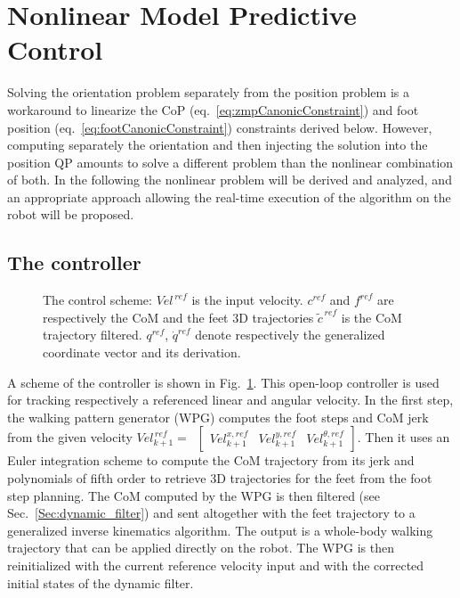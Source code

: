 
\section{Nonlinear Model Predictive Control}
\label{Sec:nmpc}

Solving the orientation problem separately from the position problem is a workaround to linearize the CoP (eq.~\eqref{eq:zmpCanonicConstraint}) and foot position (eq.~\eqref{eq:footCanonicConstraint}) constraints derived below.
However, computing separately the orientation and then injecting the solution into the position QP amounts to solve a different problem than the nonlinear combination of both.
In the following the nonlinear problem will be derived and analyzed, and an appropriate approach allowing the real-time execution of the algorithm on the robot will be proposed.

\subsection{The controller}
\label{SubSec:controller}

\begin{figure}[h]
    \centering
    
    \caption[Control scheme]{The control scheme: ${Vel}^{\,ref}$ is the input velocity.
     $c^{ref}$ and $f^{ref}$ are respectively the CoM and the feet 3D trajectories
     $\tilde{c}^{\,ref}$ is the CoM trajectory filtered.
     $q^{ref}$, $\dot q^{ref}$ denote respectively the generalized coordinate vector and its derivation.
     }
    \label{fig:combined_feedback_scheme}
\end{figure}

A scheme of the controller is shown in Fig.~\ref{fig:combined_feedback_scheme}.
This open-loop controller is used for tracking respectively a referenced linear and angular velocity.
In the first step, the walking pattern generator (WPG) computes the foot steps and CoM jerk from the given velocity
$ {Vel}^{\,ref}_{k+1} =$~$
\begin{bmatrix}
{Vel}_{k+1}^{x,ref} & {Vel}_{k+1}^{y,ref} & {Vel}_{k+1}^{\theta,ref}
\end{bmatrix} $.
Then it uses an Euler integration scheme to compute the CoM trajectory from its jerk and polynomials of fifth order to retrieve 3D trajectories for the feet from the foot step planning.
The CoM computed by the WPG is then filtered (see Sec.~\ref{Sec:dynamic_filter}) and sent altogether with the feet trajectory to a generalized inverse kinematics algorithm.
The output is a whole-body walking trajectory that can be applied directly on the robot.
The WPG is then reinitialized with the current reference velocity input and with the corrected initial states of the dynamic filter.

